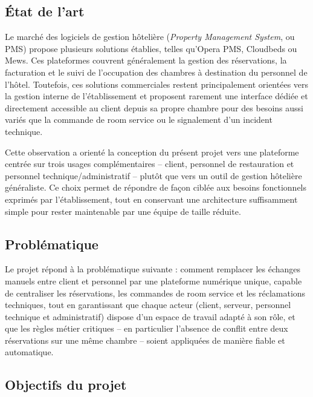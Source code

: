 \documentclass[12pt,a4paper]{report}
\begin{document}
\subsection{État de l'art}

Le marché des logiciels de gestion hôtelière (\textit{Property Management
System}, ou PMS) propose plusieurs solutions établies, telles qu'Opera
PMS, Cloudbeds ou Mews. Ces plateformes couvrent généralement la gestion
des réservations, la facturation et le suivi de l'occupation des chambres
à destination du personnel de l'hôtel. Toutefois, ces solutions
commerciales restent principalement orientées vers la gestion interne de
l'établissement et proposent rarement une interface dédiée et directement
accessible au client depuis sa propre chambre pour des besoins aussi
variés que la commande de room service ou le signalement d'un incident
technique.

Cette observation a orienté la conception du présent projet vers une
plateforme centrée sur trois usages complémentaires -- client, personnel
de restauration et personnel technique/administratif -- plutôt que vers un
outil de gestion hôtelière généraliste. Ce choix permet de répondre de
façon ciblée aux besoins fonctionnels exprimés par l'établissement,
tout en conservant une architecture suffisamment simple pour rester
maintenable par une équipe de taille réduite.

\subsection{Problématique}

Le projet répond à la problématique suivante : comment remplacer les
échanges manuels entre client et personnel par une plateforme numérique
unique, capable de centraliser les réservations, les commandes de room
service et les réclamations techniques, tout en garantissant que chaque
acteur (client, serveur, personnel technique et administratif) dispose
d'un espace de travail adapté à son rôle, et que les règles métier
critiques -- en particulier l'absence de conflit entre deux réservations
sur une même chambre -- soient appliquées de manière fiable et automatique.

\subsection{Objectifs du projet}
\end{document}
